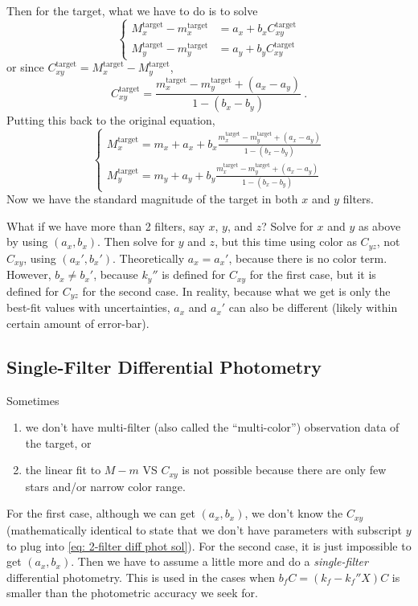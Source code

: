 Then for the target, what we have to do is to solve
\begin{equation}
\begin{cases}
  M_x^\mathrm{target} - m_x^\mathrm{target} &= a_x + b_x C_{xy}^\mathrm{target} \\
  M_y^\mathrm{target} - m_y^\mathrm{target} &= a_y + b_y C_{xy}^\mathrm{target}
\end{cases}
\end{equation}
or since $ C_{xy}^\mathrm{target} = M_x^\mathrm{target} - M_y^\mathrm{target} $,
\begin{equation}
  C_{xy}^\mathrm{target} = \frac{m_x^\mathrm{target} - m_y^\mathrm{target} + (a_x - a_y)}{1 - (b_x - b_y)} ~.
\end{equation}
Putting this back to the original equation,
\begin{equation}\label{eq: 2-filter diff phot sol}
\begin{cases}
  M_x^\mathrm{target}
    = m_x + a_x + b_x \frac{m_x^\mathrm{target} - m_y^\mathrm{target} + (a_x - a_y)}{1 - (b_x - b_y)} \\
  M_y^\mathrm{target}
    = m_y + a_y + b_y \frac{m_x^\mathrm{target} - m_y^\mathrm{target} + (a_x - a_y)}{1 - (b_x - b_y)}
\end{cases}
\end{equation}
Now we have the standard magnitude of the target in both $ x $ and $ y $ filters.

What if we have more than 2 filters, say $ x $, $ y $, and $ z $? Solve for $ x $ and $ y $ as above by using $ (a_x, b_x) $. Then solve for $ y $ and $ z $, but this time using color as $ C_{yz} $, not $ C_{xy} $, using $ (a_x', b_x') $. Theoretically $ a_x = a_x' $, because there is no color term. However, $ b_x \neq b_x' $, because $ k_y'' $ is defined for $ C_{xy} $ for the first case, but it is defined for $ C_{yz} $ for the second case. In reality, because what we get is only the best-fit values with uncertainties, $ a_x $ and $ a_x' $ can also be different (likely within certain amount of error-bar).

\subsection{Single-Filter Differential Photometry}
Sometimes 
\begin{enumerate}
\item we don't have multi-filter (also called the ``multi-color'') observation data of the  target, or
\item the linear fit to $ M - m $ VS $ C_{xy} $ is not possible because there are only few stars and/or narrow color range. 
\end{enumerate}
For the first case, although we can get $ (a_x, b_x) $, we don't know the $ C_{xy} $ (mathematically identical to state that we don't have parameters with subscript $ y $ to plug into \cref{eq: 2-filter diff phot sol}). For the second case, it is just impossible to get $ (a_x, b_x) $. Then we have to assume a little more and do a \textit{single-filter} differential photometry. This is used in the cases when $ b_f C = (k_f - k_f'' X) C $ is smaller than the photometric accuracy we seek for. 

